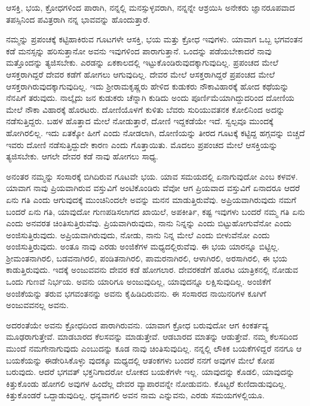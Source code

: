 {\small ಆಸಕ್ತಿ, ಭಯ, ಕ್ರೋಧಗಳಿಂದ ಪಾರಾಗಿ, ನನ್ನಲ್ಲಿ ಮನಸ್ಸುಳ್ಳವರಾಗಿ, ನನ್ನನ್ನೇ ಆಶ್ರಯಿಸಿ ಅನೇಕರು ಜ್ಞಾನರೂಪವಾದ ತಪಸ್ಸಿನಿಂದ ಪವಿತ್ರರಾಗಿ ನನ್ನ ಭಾವವನ್ನು ಹೊಂದುತ್ತಾರೆ.}

ನಮ್ಮನ್ನು ಪ್ರಪಂಚಕ್ಕೆ ಕಟ್ಟಿಹಾಕಿರುವ ಗೂಟಗಳೇ ಆಸಕ್ತಿ, ಭಯ ಮತ್ತು ಕ್ರೋಧ ಇವುಗಳು. ಯಾವಾಗ ಒಬ್ಬ ಭಗವಂತನ ಕಡೆ ಮನಸ್ಸನ್ನು ಹರಿಸುತ್ತಾನೋ ಅವನು ಇವುಗಳಿಂದ ಪಾರಾಗುತ್ತಾನೆ. ಒಂದನ್ನು ಪಡೆಯಬೇಕಾದರೆ ನಾವು ಮತ್ತೊಂದನ್ನು ತ್ಯಜಿಸಬೇಕು. ಎರಡನ್ನು ಏಕಕಾಲದಲ್ಲಿ ಇಟ್ಟುಕೊಂಡಿರುವುದಕ್ಕಾಗುವುದಿಲ್ಲ. ಪ್ರಪಂಚದ ಮೇಲೆ ಆಸಕ್ತರಾಗಿದ್ದರೆ ದೇವರ ಕಡೆಗೆ ಹೋಗಲು ಆಗುವುದಿಲ್ಲ. ದೇವರ ಮೇಲೆ ಆಸಕ್ತರಾಗಿದ್ದರೆ ಪ್ರಪಂಚದ ಮೇಲೆ ಆಸಕ್ತರಾಗಿರುವುದಕ್ಕಾಗುವುದಿಲ್ಲ. ಇದು ಶ್ರೀರಾಮಕೃಷ್ಣರು ಹೇಳಿದ ಕುಡುಕರು ನೌಕಾವಿಹಾರಕ್ಕೆ ಹೋದ ಕಥೆಯನ್ನು ನೆನಪಿಗೆ ತರುವುದು. ನಾಲ್ಕೈದು ಜನ ಕುಡುಕರು ಚೆನ್ನಾಗಿ ಕುಡಿದು ಅಂದು ಪೂರ್ಣಿಮೆಯಾಗಿದ್ದುದರಿಂದ ದೋಣಿಯ ಮೇಲೆ ನೌಕಾ ವಿಹಾರಕ್ಕೆ ಹೊರಟರು. ದೋಣಿಯೊಳಗೆ ಕುಳಿತು ಬೆವರು ಸುರಿಯುವತನಕ ಕೋಲಿನಿಂದ ಅದನ್ನು ನಡೆಸುತ್ತಿದ್ದರು. ಬಹಳ ಹೊತ್ತಾದ ಮೇಲೆ ನೋಡುತ್ತಾರೆ, ದೋಣಿ ಇದ್ದಕಡೆಯೇ ಇದೆ. ಸ್ವಲ್ಪವೂ ಮುಂದಕ್ಕೆ ಹೋಗಿರಲಿಲ್ಲ. ಇದು ಏತಕ್ಕೋ ಹೀಗೆ ಎಂದು ನೋಡಲಾಗಿ, ದೋಣಿಯನ್ನು ತೀರದ ಗೂಟಕ್ಕೆ ಕಟ್ಟಿದ್ದ ಹಗ್ಗವನ್ನು ಬಿಚ್ಚದೆ ಇವರು ದೋಣಿ ನಡೆಸುತ್ತಿದ್ದುದೇ ಕಾರಣ ಎಂದು ಗೊತ್ತಾಯಿತು. ಮೊದಲು ಪ್ರಪಂಚದ ಮೇಲೆ ಆಸಕ್ತಿಯನ್ನು ತ್ಯಜಿಸಬೇಕು. ಆಗಲೇ ದೇವರ ಕಡೆ ನಾವು ಹೋಗಲು ಸಾಧ್ಯ.

ಅನಂತರ ನಮ್ಮನ್ನು ಸಂಸಾರಕ್ಕೆ ಬಿಗಿದಿರುವ ಗೂಟವೇ ಭಯ. ಯಾವ ಸಮಯದಲ್ಲಿ ಏನಾಗುವುದೋ ಎಂಬ ಕಳವಳ. ಯಾವಾಗ ನಾವು ಪ್ರಿಯವಾಗಿರುವ ವಸ್ತುವಿಗೆ ಅಂಟಿಕೊಂಡಿರು ವೆವೋ ಆಗ ಪ್ರಿಯವಾದ ವಸ್ತುವಿಗೆ ಏನಾದರೂ ಆದರೆ ಏನು ಗತಿ ಎಂದು ಆಗುವುದಕ್ಕೆ ಮುಂಚಿನಿಂದಲೇ ಅವನ್ನು ಮನನ ಮಾಡುತ್ತಿರುವೆವು. ಅಪ್ರಿಯವಾಗಿರುವುದು ನಮಗೆ ಬಂದರೆ ಏನು ಗತಿ, ಯಾವುದೋ ಗುಣಪಡಿಸಲಾಗದ ಖಾಯಿಲೆ, ಅಪಕೀರ್ತಿ, ಕಷ್ಟ ಇವುಗಳು ಬಂದರೆ ನಮ್ಮ ಗತಿ ಏನು ಎಂದು ಅನವರತ ಚಿಂತಿಸುತ್ತಿರುವೆವು. ಪ್ರಿಯವಾಗಿರುವುದು, ನಾನು ನಿನ್ನನ್ನು ಎಂದು ಬಿಟ್ಟುಹೋಗುವೆನೋ ಎಂದು ಅಂಜಿಸುತ್ತಿರುವುದು. ಅಪ್ರಿಯವಾಗಿರುವುದು, ನೋಡು, ನಾನು ನಿನ್ನ ಮೇಲೆ ಎಂದು ಬೀಳುವೆನೋ ಎಂದು ಅಂಜಿಸುತ್ತಿರುವುದು. ಅಂತೂ ನಾವು ಎರಡು ಅಂಜಿಕೆಗಳ ಮಧ್ಯದಲ್ಲಿರುವೆವು. ಈ ಭಯ ಯಾರನ್ನೂ ಬಿಟ್ಟಿಲ್ಲ. ಶ್ರೀಮಂತನಾಗಿರಲಿ, ಬಡವನಾಗಿರಲಿ, ಪಂಡಿತನಾಗಿರಲಿ, ಪಾಮರನಾಗಿರಲಿ, ಆಳಾಗಿರಲಿ, ಅರಸಾಗಿರಲಿ, ಈ ಭಯ ಕಾಡುತ್ತಿರುವುದು. ಇದಕ್ಕೆ ಅಂಜುವವನು ದೇವರ ಕಡೆ ಹೋಗಲಾರ. ದೇವರಕಡೆಗೆ ಹೊರಟ ಯಾತ್ರಿಕನಲ್ಲಿ ನೋಡುವ ಒಂದು ಗುಣವೆ ನಿರ್ಭಯ. ಅವನು ಯಾರಿಗೂ ಅಂಜುವುದಿಲ್ಲ, ಯಾವುದನ್ನೂ ಲಕ್ಷಿಸುವುದಿಲ್ಲ. ಅಂಜಿಕೆಗೆ ಅಂಜಿಕೆಯನ್ನು ತರುವ ಭಗವಂತನನ್ನು ಅವನು ಕೈಹಿಡಿದಿರುವನು. ಈ ಸಂಸಾರದ ನಾಯಿನರಿಗಳ ಕೂಗಿಗೆ ಅಂಜುವವನಲ್ಲ ಅವನು.

ಅದರಂತೆಯೇ ಅವನು ಕ್ರೋಧದಿಂದ ಪಾರಾಗಿರುವನು. ಯಾವಾಗ ಕ್ರೋಧ ಬರುವುದೋ ಆಗ ಕಿಂಕರ್ತವ್ಯ ಮೂಢರಾಗುತ್ತೇವೆ. ಮಾಡಬಾರದ ಕೆಲಸವನ್ನು ಮಾಡುತ್ತೇವೆ. ಆಡಬಾರದ ಮಾತನ್ನು ಆಡುತ್ತೇವೆ. ನಮ್ಮ ಕೆಲಸದಿಂದ ಮುಂದೆ ನಮಗೇನಾಗುವುದು ಎಂಬುದನ್ನು ಕೂಡ ನಾವು ಚಿಂತಿಸುವುದಿಲ್ಲ. ನನ್ನಲ್ಲಿ ಲೌಕಿಕ ಬಯಕೆಗಳಿದ್ದರೆ ನನಗೂ ಆ ಬಯಕೆಯನ್ನು ಈಡೇರಿಸಿಕೊಳ್ಳು ವುದಕ್ಕೂ ಮಧ್ಯದಲ್ಲಿ ಆತಂಕಗಳು ಬಂದರೆ ನನಗೆ ಅವುಗಳ ಮೇಲೆ ಕೋಪ ಬರುವುದು. ಆದರೆ ಭಗವತ್ ಭಕ್ತನಿಗಾದರೋ ಲೋಕದ ಬಯಕೆಗಳೇ ಇಲ್ಲ. ಯಾವುದನ್ನು ಕೊಡಲಿ, ಯಾವುದನ್ನು ಕಿತ್ತುಕೊಂಡು ಹೋಗಲಿ ಅವುಗಳ ಹಿಂದೆಲ್ಲ ದೇವರ ವ್ಯಾಪಾರವನ್ನೇ ನೋಡುವನು. ಕೊಟ್ಟರೆ ಕುಣಿದಾಡುವುದಿಲ್ಲ. ಕಿತ್ತುಕೊಂಡರೆ ಒದ್ದಾಡುವುದಿಲ್ಲ. ಧನ್ಯವಾಗಲಿ ಅವನ ನಾಮ ಎನ್ನುವನು, ಎರಡು ಸಮಯಗಳಲ್ಲಿಯೂ.


